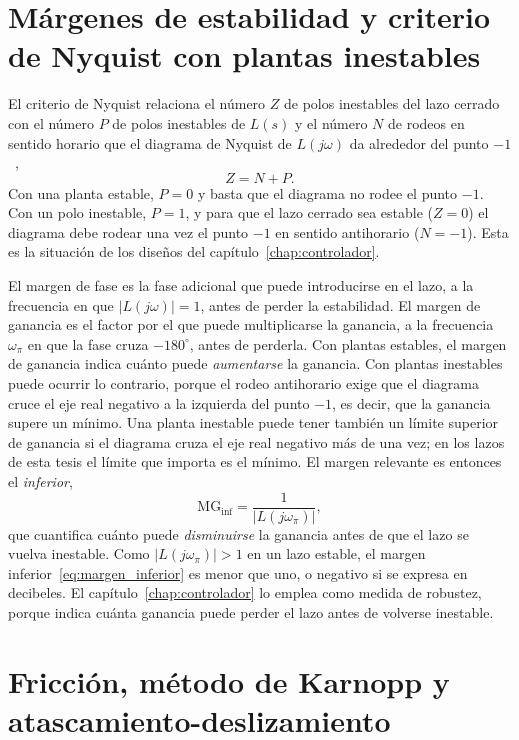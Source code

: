 \section{Márgenes de estabilidad y criterio de Nyquist con plantas inestables}\label{sec:fund_nyquist}

El criterio de Nyquist relaciona el número $Z$ de polos inestables del lazo cerrado con el número $P$ de polos inestables de $L(s)$ y el número $N$ de rodeos en sentido horario que el diagrama de Nyquist de $L(j\omega)$ da alrededor del punto $-1$~\cite{gene},
\begin{equation}
Z=N+P .
\label{eq:nyquist}
\end{equation}
Con una planta estable, $P=0$ y basta que el diagrama no rodee el punto $-1$. Con un polo inestable, $P=1$, y para que el lazo cerrado sea estable ($Z=0$) el diagrama debe rodear una vez el punto $-1$ en sentido antihorario ($N=-1$). Esta es la situación de los diseños del capítulo~\ref{chap:controlador}.

El margen de fase es la fase adicional que puede introducirse en el lazo, a la frecuencia en que $|L(j\omega)|=1$, antes de perder la estabilidad. El margen de ganancia es el factor por el que puede multiplicarse la ganancia, a la frecuencia $\omega_\pi$ en que la fase cruza $-180^\circ$, antes de perderla. Con plantas estables, el margen de ganancia indica cuánto puede \emph{aumentarse} la ganancia. Con plantas inestables puede ocurrir lo contrario, porque el rodeo antihorario exige que el diagrama cruce el eje real negativo a la izquierda del punto $-1$, es decir, que la ganancia supere un mínimo. Una planta inestable puede tener también un límite superior de ganancia si el diagrama cruza el eje real negativo más de una vez; en los lazos de esta tesis el límite que importa es el mínimo. El margen relevante es entonces el \emph{inferior},
\begin{equation}
\mathrm{MG}_{\inf}=\frac{1}{|L(j\omega_\pi)|} ,
\label{eq:margen_inferior}
\end{equation}
que cuantifica cuánto puede \emph{disminuirse} la ganancia antes de que el lazo se vuelva inestable. Como $|L(j\omega_\pi)|>1$ en un lazo estable, el margen inferior~\eqref{eq:margen_inferior} es menor que uno, o negativo si se expresa en decibeles. El capítulo~\ref{chap:controlador} lo emplea como medida de robustez, porque indica cuánta ganancia puede perder el lazo antes de volverse inestable.

\section{Fricción, método de Karnopp y atascamiento-deslizamiento}\label{sec:fund_friccion}

